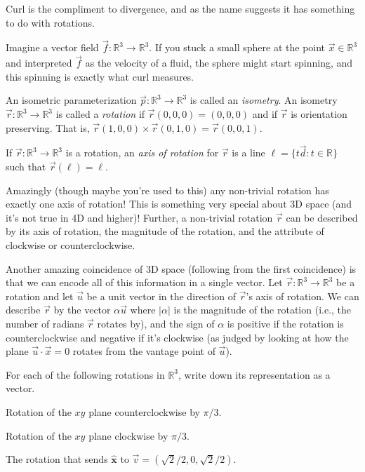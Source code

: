 \documentclass{problemset}
\newcommand{\xh}{{\hat {\mathbf x}}}
\newcommand{\R}{\mathbb{R}}
\begin{document}
	Curl is the compliment to divergence, and as the name suggests it has something to do
	with rotations.

	Imagine a vector field $\vec f:\R^3\to\R^3$.  If you stuck a small sphere at the point
	$\vec x\in\R^3$ and interpreted $\vec f$ as the velocity of a fluid, the sphere might
	start spinning, and this spinning is exactly what curl measures.  

	\begin{definition}[Rotation]
		An isometric parameterization $\vec p:\R^3\to\R^3$ is called an \emph{isometry}.
		An isometry $\vec r:\R^3\to\R^3$ is called a \emph{rotation} if $\vec r(0,0,0)=(0,0,0)$
		and if $\vec r$ is orientation preserving.  That is, $\vec r(1,0,0)\times \vec r(0,1,0) = \vec r(0,0,1)$.

		If $\vec r:\R^3\to\R^3$ is a rotation, an \emph{axis of rotation} for $\vec r$ is a line
		$\ell = \{t\vec d:t\in\R\}$ such that $\vec r(\ell) = \ell$.
	\end{definition}

	Amazingly (though maybe you're used to this) any non-trivial rotation has exactly one axis of rotation!
	This is something very special about 3D space (and it's not true in 4D and higher)!  
	Further, a non-trivial rotation $\vec r$ can be described
	by its axis of rotation, the magnitude of the rotation, and the attribute of clockwise or counterclockwise.

	Another amazing coincidence of 3D space (following from the first coincidence) 
	is that we can encode all of this information in a single vector.
	Let $\vec r:\R^3\to \R^3$ be a rotation and let $\vec u$ be a unit vector in the direction of $\vec r$'s 
	axis of rotation.  We can describe $\vec r$ by the vector $\alpha \vec u$ where $|\alpha|$ is the magnitude
	of the rotation (i.e., the number of radians $\vec r$ rotates by), and the sign of $\alpha$ is positive
	if the rotation is counterclockwise and negative if it's clockwise (as judged by looking at
	how the plane $\vec u\cdot \vec x=0$ rotates from the vantage point of $\vec u$).

	\question
	For each of the following rotations in $\R^3$, write down its representation as a vector.
	\begin{parts}
		\item Rotation of the $xy$ plane counterclockwise by $\pi/3$.
		\item Rotation of the $xy$ plane clockwise by $\pi/3$.
		\item The rotation that sends $\xh$ to $\vec v=(\sqrt{2}/2, 0, \sqrt{2}/2)$.
	\end{parts}
\end{document}
